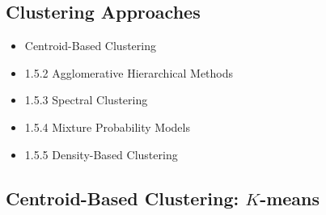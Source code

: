 \subsection{Clustering Approaches}

\begin{itemize}
\item Centroid-Based Clustering
\item 1.5.2 Agglomerative Hierarchical Methods
\item 1.5.3 Spectral Clustering
\item 1.5.4 Mixture Probability Models
\item 1.5.5 Density-Based Clustering
\end{itemize}

\subsection{Centroid-Based Clustering: $K$-means}

